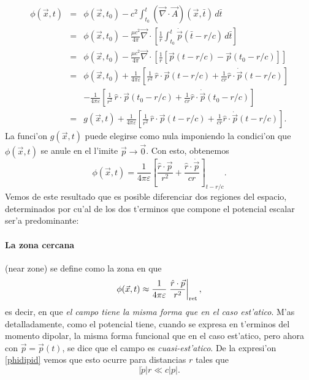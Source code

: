 \begin{eqnarray}
\phi(\vec{x},t)&=&\phi(\vec{x},t_0)-c^2\int_{t_0}^t(\vec{\nabla}\cdot\vec{A})(\vec{x},\bar{t})\,d\bar{t} \\
&=&\phi(\vec{x},t_0)-\frac{\mu c^2}{4\pi} \vec{\nabla}\cdot\left[\frac{1}{r}\int_{t_0}^t\dot{\vec{p}}(\bar{t}-{r}/{c})\,d\bar{t}\right] \\
&=&\phi(\vec{x},t_0)-\frac{\mu c^2}{4\pi} \vec{\nabla}\cdot\left[\frac{1}{r}\left[\vec{p}(t-{r}/{c})-\vec{p}(t_0-{r}/{c})\right]\right] \\
&=&\phi(\vec{x},t_0)+\frac{1}{4\pi\varepsilon}\left[\frac{1}{r^2}\,\hat{r}\cdot\vec{p}(t-{r}/{c})+\frac{1}{cr}\hat{r}\cdot\dot{\vec{p}}(t-{r}/{c})\right] \nonumber\\
&& -\frac{1}{4\pi\varepsilon}\left[\frac{1}{r^2}\,\hat{r}\cdot\vec{p}(t_0-{r}/{c})+\frac{1}{cr}\hat{r}\cdot\dot{\vec{p}}(t_0-{r}/{c})\right] \\
&=& g(\vec{x},t)+\frac{1}{4\pi\varepsilon}\left[\frac{1}{r^2}\,\hat{r}\cdot\vec{p}(t-{r}/{c})+\frac{1}{cr}\hat{r}\cdot\dot{\vec{p}}(t-{r}/{c})\right] .
\end{eqnarray}
La funci'on $g(\vec{x},t)$ puede elegirse como nula imponiendo la condici'on que $\phi(\vec{x},t)$ se anule en el l'imite $\vec{p}\to\vec{0}$. Con esto, obtenemos 
\begin{equation}
\boxed{\phi(\vec{x},t)=\frac{1}{4\pi\varepsilon}\left[\frac{\hat{r}\cdot\vec{p}}{r^2}+\frac{\hat{r}\cdot\dot{\vec{p}}}{cr}\right]_{t-{r}/{c}}.} \label{phidipid}
\end{equation}
Vemos de este resultado que es posible diferenciar dos regiones del espacio, determinados por cu'al de los dos t'erminos que compone el potencial escalar ser'a predominante:

\paragraph{La \textbf{zona cercana}} (near zone) se define como la zona en que
\begin{equation}
\phi(\vec{x},t)\approx\frac{1}{4\pi\varepsilon}\left.\frac{\hat{r}\cdot\vec{p}}{r^2}\right|_{\rm ret},
\end{equation}
es decir, en que \textit{el campo tiene la misma forma que en el caso est'atico}. M'as detalladamente, como el potencial tiene, cuando se expresa en t'erminos del momento dipolar, la misma forma funcional que en el caso est'atico, pero ahora con $\vec{p}=\vec{p}(t)$, se dice que el campo es \textit{cuasi-est'atico}. De la expresi'on \eqref{phidipid} vemos que esto ocurre para distancias $r$ tales que
\begin{equation}
|\dot{p}|r\ll c|p|.
\end{equation}

